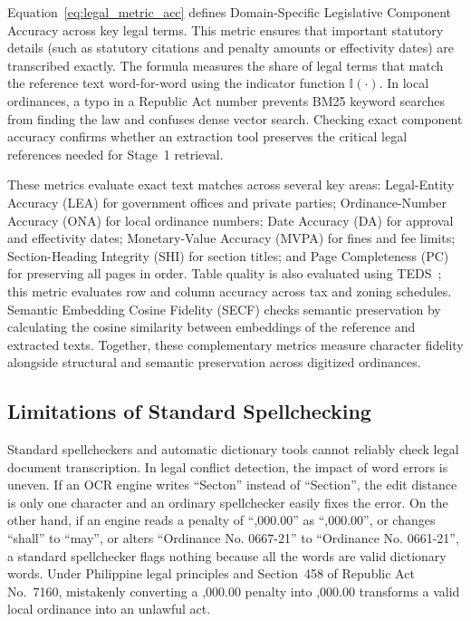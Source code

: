 Equation~\ref{eq:legal_metric_acc} defines Domain-Specific Legislative Component Accuracy across key legal terms. This metric ensures that important statutory details (such as statutory citations and penalty amounts or effectivity dates) are transcribed exactly. The formula measures the share of legal terms that match the reference text word-for-word using the indicator function $\mathbb{I}(\cdot)$. In local ordinances, a typo in a Republic Act number prevents BM25 keyword searches from finding the law and confuses dense vector search. Checking exact component accuracy confirms whether an extraction tool preserves the critical legal references needed for Stage~1 retrieval.

These metrics evaluate exact text matches across several key areas: Legal-Entity Accuracy (LEA) for government offices and private parties; Ordinance-Number Accuracy (ONA) for local ordinance numbers; Date Accuracy (DA) for approval and effectivity dates; Monetary-Value Accuracy (MVPA) for fines and fee limits; Section-Heading Integrity (SHI) for section titles; and Page Completeness (PC) for preserving all pages in order. Table quality is also evaluated using TEDS~\cite{zhong2020image}; this metric evaluates row and column accuracy across tax and zoning schedules. Semantic Embedding Cosine Fidelity (SECF) checks semantic preservation by calculating the cosine similarity between embeddings of the reference and extracted texts. Together, these complementary metrics measure character fidelity alongside structural and semantic preservation across digitized ordinances.


\subsection{Limitations of Standard Spellchecking}
Standard spellcheckers and automatic dictionary tools cannot reliably check legal document transcription. In legal conflict detection, the impact of word errors is uneven. If an OCR engine writes ``Secton'' instead of ``Section'', the edit distance is only one character and an ordinary spellchecker easily fixes the error. On the other hand, if an engine reads a penalty of ``,000.00'' as ``,000.00'', or changes ``shall'' to ``may'', or alters ``Ordinance No. 0667-21'' to ``Ordinance No. 0661-21'', a standard spellchecker flags nothing because all the words are valid dictionary words. Under Philippine legal principles and Section~458 of Republic Act No.~7160, mistakenly converting a ,000.00 penalty into ,000.00 transforms a valid local ordinance into an unlawful act.

